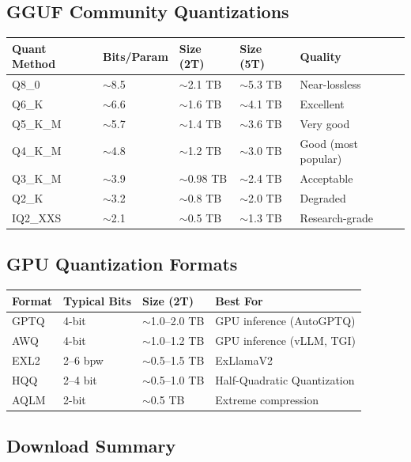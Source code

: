 \documentclass[11pt,a4paper]{article}
\begin{document}
\subsection{GGUF Community Quantizations}

\begin{center}
\begin{tabular}{lllll}
\toprule
\textbf{Quant Method} & \textbf{Bits/Param} & \textbf{Size (2T)} & \textbf{Size (5T)} & \textbf{Quality} \\
\midrule
Q8\_0 & $\sim$8.5 & $\sim$2.1 TB & $\sim$5.3 TB & Near-lossless \\
Q6\_K & $\sim$6.6 & $\sim$1.6 TB & $\sim$4.1 TB & Excellent \\
Q5\_K\_M & $\sim$5.7 & $\sim$1.4 TB & $\sim$3.6 TB & Very good \\
Q4\_K\_M & $\sim$4.8 & $\sim$1.2 TB & $\sim$3.0 TB & Good (most popular) \\
Q3\_K\_M & $\sim$3.9 & $\sim$0.98 TB & $\sim$2.4 TB & Acceptable \\
Q2\_K & $\sim$3.2 & $\sim$0.8 TB & $\sim$2.0 TB & Degraded \\
IQ2\_XXS & $\sim$2.1 & $\sim$0.5 TB & $\sim$1.3 TB & Research-grade \\
\bottomrule
\end{tabular}
\end{center}

\subsection{GPU Quantization Formats}

\begin{center}
\begin{tabular}{llll}
\toprule
\textbf{Format} & \textbf{Typical Bits} & \textbf{Size (2T)} & \textbf{Best For} \\
\midrule
GPTQ & 4-bit & $\sim$1.0--2.0 TB & GPU inference (AutoGPTQ) \\
AWQ & 4-bit & $\sim$1.0--1.2 TB & GPU inference (vLLM, TGI) \\
EXL2 & 2--6 bpw & $\sim$0.5--1.5 TB & ExLlamaV2 \\
HQQ & 2--4 bit & $\sim$0.5--1.0 TB & Half-Quadratic Quantization \\
AQLM & 2-bit & $\sim$0.5 TB & Extreme compression \\
\bottomrule
\end{tabular}
\end{center}

\subsection{Download Summary}
\end{document}
